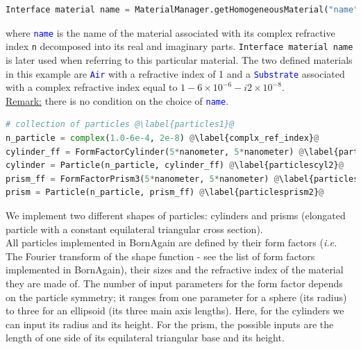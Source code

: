 \begin{lstlisting}[language=python, style=eclipse,numbers=none]
Interface material name = MaterialManager.getHomogeneousMaterial("name", Re(n), Im(n))
\end{lstlisting}

\noindent where \texttt{\textcolor{blue}{name}} is the name of the
material associated with its complex refractive index
\texttt{n} decomposed into its real and imaginary parts. \texttt{Interface material name} is later used when
referring to this particular material. The two defined materials in this example are \texttt{\textcolor{blue}{Air}} with a refractive
index of 1 and a \texttt{\textcolor{blue}{Substrate}} associated with a complex refractive index
equal to $1-6\times 10^{-6} -i2\times 10^{-8} $. \\

\noindent \underline{Remark:} there is no condition on the choice of
\texttt{\textcolor{blue}{name}}. 


\begin{lstlisting}[language=python,
  style=eclipseboxed,name=ex1,nolol]
# collection of particles @\label{particles1}@
n_particle = complex(1.0-6e-4, 2e-8) @\label{complx_ref_index}@
cylinder_ff = FormFactorCylinder(5*nanometer, 5*nanometer) @\label{particlescyl1}@
cylinder = Particle(n_particle, cylinder_ff) @\label{particlescyl2}@
prism_ff = FormFactorPrism3(5*nanometer, 5*nanometer) @\label{particlesprism1}@
prism = Particle(n_particle, prism_ff) @\label{particlesprism2}@
\end{lstlisting}

 \noindent We implement two different shapes of particles: cylinders and
 prisms (elongated particle with a constant equilateral triangular cross section).\\ All particles implemented in BornAgain are defined by their
 form factors (\textit{i.e.} The Fourier transform of the shape function - see the list of form factors implemented
  in BornAgain), their sizes and the refractive index of the material
  they are made of. The number of input parameters for the form
  factor depends on the
  particle symmetry; it ranges from one parameter for a sphere (its
  radius) to three for an ellipsoid (its three main axis lengths). Here,  for the
  cylinders we can input its radius and its height. For the prism, 
  the possible inputs are the length of one side of its equilateral triangular
  base and its height.\\

